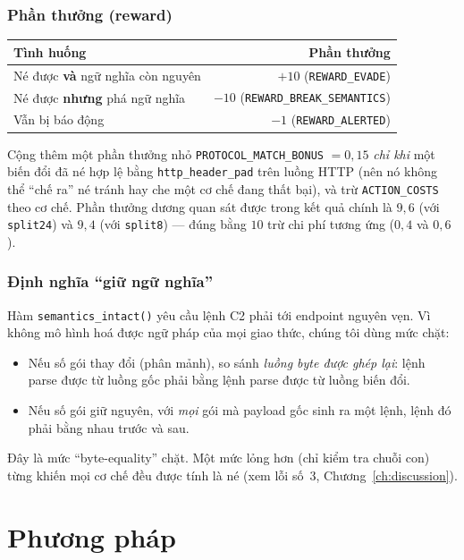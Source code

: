\documentclass[12pt,a4paper]{report}
\begin{document}
\subsection{Phần thưởng (reward)}
\begin{center}
\begin{tabular}{lr}
\toprule
Tình huống & Phần thưởng \\
\midrule
Né được \textbf{và} ngữ nghĩa còn nguyên & $+10$ (\texttt{REWARD\_EVADE}) \\
Né được \textbf{nhưng} phá ngữ nghĩa & $-10$ (\texttt{REWARD\_BREAK\_SEMANTICS}) \\
Vẫn bị báo động & $-1$ (\texttt{REWARD\_ALERTED}) \\
\bottomrule
\end{tabular}
\end{center}
Cộng thêm một phần thưởng nhỏ \texttt{PROTOCOL\_MATCH\_BONUS} $= 0{,}15$ \emph{chỉ khi}
một biến đổi đã né hợp lệ bằng \texttt{http\_header\_pad} trên luồng HTTP (nên nó
không thể ``chế ra'' né tránh hay che một cơ chế đang thất bại), và trừ
\texttt{ACTION\_COSTS} theo cơ chế. Phần thưởng
dương quan sát được trong kết quả chính là $9{,}6$ (với \texttt{split24}) và $9{,}4$
(với \texttt{split8}) — đúng bằng $10$ trừ chi phí tương ứng ($0{,}4$ và $0{,}6$).

\subsection{Định nghĩa ``giữ ngữ nghĩa''}
\label{sec:semantics}
Hàm \texttt{semantics\_intact()} yêu cầu lệnh C2 phải tới endpoint nguyên vẹn. Vì
không mô hình hoá được ngữ pháp của mọi giao thức, chúng tôi dùng mức chặt:
\begin{itemize}
  \item Nếu số gói thay đổi (phân mảnh), so sánh \emph{luồng byte được ghép lại}:
        lệnh parse được từ luồng gốc phải bằng lệnh parse được từ luồng biến đổi.
  \item Nếu số gói giữ nguyên, với \emph{mọi} gói mà payload gốc sinh ra một lệnh,
        lệnh đó phải bằng nhau trước và sau.
\end{itemize}
Đây là mức ``byte-equality'' chặt. Một mức lỏng hơn (chỉ kiểm tra chuỗi con) từng
khiến mọi cơ chế đều được tính là né (xem lỗi số~3, Chương~\ref{ch:discussion}).

\chapter{Phương pháp}
\label{ch:method}
\end{document}
